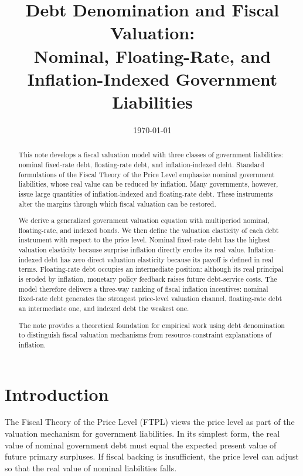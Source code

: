 \documentclass[12pt,a4paper]{article}
\title{\textbf{Debt Denomination and Fiscal Valuation:\\
Nominal, Floating-Rate, and Inflation-Indexed Government Liabilities}}
\author{}
\date{\today}
\begin{document}
\maketitle

\begin{abstract}
This note develops a fiscal valuation model with three classes of government liabilities:
nominal fixed-rate debt, floating-rate debt, and inflation-indexed debt. Standard
formulations of the Fiscal Theory of the Price Level emphasize nominal government
liabilities, whose real value can be reduced by inflation. Many governments, however,
issue large quantities of inflation-indexed and floating-rate debt. These instruments
alter the margins through which fiscal valuation can be restored.

We derive a generalized government valuation equation with multiperiod nominal,
floating-rate, and indexed bonds. We then define the valuation elasticity of each debt
instrument with respect to the price level. Nominal fixed-rate debt has the highest
valuation elasticity because surprise inflation directly erodes its real value.
Inflation-indexed debt has zero direct valuation elasticity because its payoff is defined
in real terms. Floating-rate debt occupies an intermediate position: although its real
principal is eroded by inflation, monetary policy feedback raises future debt-service
costs. The model therefore delivers a three-way ranking of fiscal inflation incentives:
nominal fixed-rate debt generates the strongest price-level valuation channel,
floating-rate debt an intermediate one, and indexed debt the weakest one.

The note provides a theoretical foundation for empirical work using debt denomination
to distinguish fiscal valuation mechanisms from resource-constraint explanations of
inflation.
\end{abstract}

\newpage

\section{Introduction}

The Fiscal Theory of the Price Level (FTPL) views the price level as part of the
valuation mechanism for government liabilities. In its simplest form, the real value of
nominal government debt must equal the expected present value of future primary
surpluses. If fiscal backing is insufficient, the price level can adjust so that the real
value of nominal liabilities falls.
\end{document}
